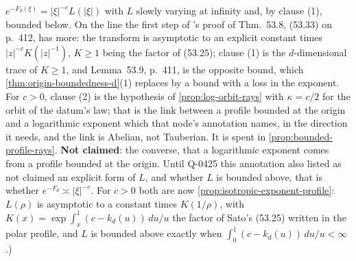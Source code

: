 \begin{lemma}
{$e^{-F_d(\xi)} = |\xi|^{-c}L(|\xi|)$ with $L$
slowly varying at infinity and, by clause (1), bounded below. On the line the first step of
's proof of Thm.~53.8, (53.33) on p.~412, has more: the transform is
asymptotic to an explicit constant times $|z|^{-c}K(|z|^{-1})$, $K \ge 1$ being the factor of
(53.25); clause (1) is the $d$-dimensional trace of $K \ge 1$, and Lemma~53.9, p.~411, is the
opposite bound, which \ref{thm:origin-boundedness-d}(1) replaces by a bound with a loss in the
exponent. For $c > 0$, clause (2) is the hypothesis of \ref{prop:log-orbit-rays} with
$\kappa = c/2$ for the orbit of the datum's law; that is the link between a profile bounded at the
origin and a logarithmic exponent which that node's annotation names, in the direction it needs, and
the link is Abelian, not Tauberian. It is spent in \ref{prop:bounded-profile-rays}. \textbf{Not
claimed}: the converse, that a logarithmic exponent comes from a profile bounded at the origin.
Until Q-0425 this annotation also listed as not claimed an explicit form of $L$, and whether $L$
is bounded above, that is whether $e^{-F_d} \asymp |\xi|^{-c}$. For $c > 0$ both are now
\ref{prop:isotropic-exponent-profile}: $L(\rho)$ is asymptotic to a constant times $K(1/\rho)$,
with $K(x) = \exp\int_x^1(c - k_d(u))\,du/u$ the factor of Sato's (53.25) written in the polar
profile, and $L$ is bounded above exactly when $\int_0^1(c - k_d(u))\,du/u < \infty$.)}
\end{lemma}

